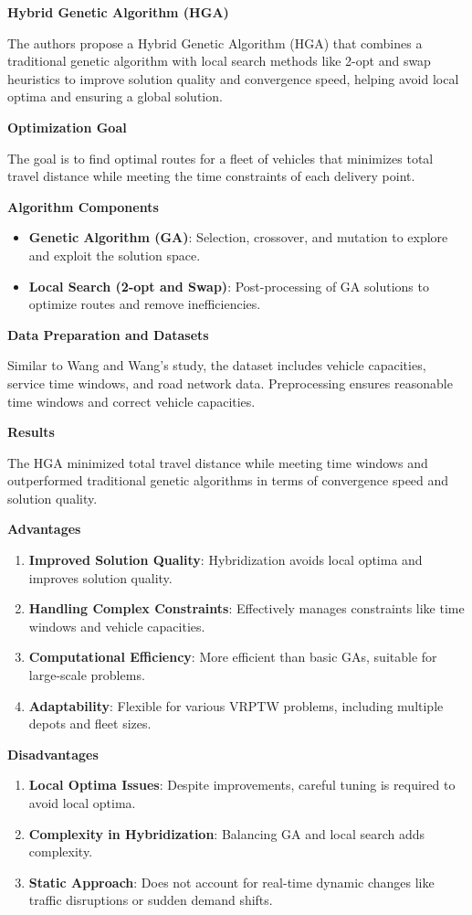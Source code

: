 \textbf{Hybrid Genetic Algorithm (HGA)}

The authors propose a Hybrid Genetic Algorithm (HGA) that combines a traditional genetic algorithm with local search methods like 2-opt and swap heuristics to improve solution quality and convergence speed, helping avoid local optima and ensuring a global solution.

\textbf{Optimization Goal}

The goal is to find optimal routes for a fleet of vehicles that minimizes total travel distance while meeting the time constraints of each delivery point.

\textbf{Algorithm Components}
\begin{itemize}
    \item \textbf{Genetic Algorithm (GA)}: Selection, crossover, and mutation to explore and exploit the solution space.
    \item \textbf{Local Search (2-opt and Swap)}: Post-processing of GA solutions to optimize routes and remove inefficiencies.
\end{itemize}

\textbf{Data Preparation and Datasets}

Similar to Wang and Wang’s study, the dataset includes vehicle capacities, service time windows, and road network data. Preprocessing ensures reasonable time windows and correct vehicle capacities.

\textbf{Results}

The HGA minimized total travel distance while meeting time windows and outperformed traditional genetic algorithms in terms of convergence speed and solution quality.

\textbf{Advantages}
\begin{enumerate}
    \item \textbf{Improved Solution Quality}: Hybridization avoids local optima and improves solution quality.
    \item \textbf{Handling Complex Constraints}: Effectively manages constraints like time windows and vehicle capacities.
    \item \textbf{Computational Efficiency}: More efficient than basic GAs, suitable for large-scale problems.
    \item \textbf{Adaptability}: Flexible for various VRPTW problems, including multiple depots and fleet sizes.
\end{enumerate}

\textbf{Disadvantages}
\begin{enumerate}
    \item \textbf{Local Optima Issues}: Despite improvements, careful tuning is required to avoid local optima.
    \item \textbf{Complexity in Hybridization}: Balancing GA and local search adds complexity.
    \item \textbf{Static Approach}: Does not account for real-time dynamic changes like traffic disruptions or sudden demand shifts.
\end{enumerate}

